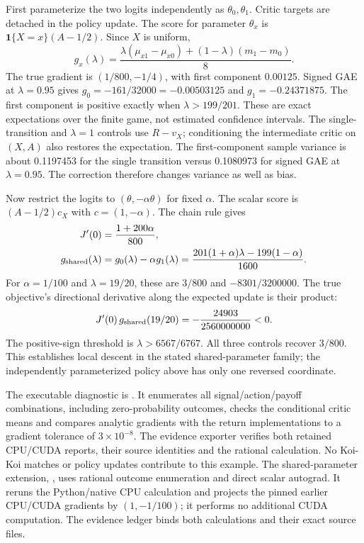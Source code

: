 \documentclass[11pt]{article}
\begin{document}
First parameterize the two logits independently as $\theta_0,\theta_1$.
Critic targets are detached in the policy update. The score for parameter $\theta_x$ is
$\mathbf1\{X=x\}(A-1/2)$. Since $X$ is uniform,
\begin{equation}
 g_x(\lambda)=\frac{\lambda(\mu_{x1}-\mu_{x0})
 +(1-\lambda)(m_1-m_0)}{8}.
\end{equation}
The true gradient is $(1/800,-1/4)$, with first component $0.00125$.
Signed GAE at $\lambda=0.95$ gives $g_0=-161/32000=-0.00503125$ and
$g_1=-0.24371875$. The first component is positive exactly
when $\lambda>199/201$. These are exact expectations over the finite game,
not estimated confidence intervals. The single-transition and $\lambda=1$
controls use $R-v_X$; conditioning the intermediate critic on $(X,A)$ also
restores the expectation. The first-component sample variance is about
0.1197453 for the single transition versus 0.1080973 for signed GAE at $\lambda=0.95$.
The correction therefore changes variance as well as bias.

Now restrict the logits to $(\theta,-\alpha\theta)$ for fixed $\alpha$.
The scalar score is $(A-1/2)c_X$ with $c=(1,-\alpha)$. The chain rule gives
\begin{align}
 J'(0)&=\frac{1+200\alpha}{800},\\
 g_{\rm shared}(\lambda)&=g_0(\lambda)-\alpha g_1(\lambda)
 =\frac{201(1+\alpha)\lambda-199(1-\alpha)}{1600}.
\end{align}
For $\alpha=1/100$ and $\lambda=19/20$, these are $3/800$ and
$-8301/3200000$. The true objective's directional derivative along the expected
update is their product:
\begin{equation}
 J'(0)\,g_{\rm shared}(19/20)=-\frac{24903}{2560000000}<0.
\end{equation}
The positive-sign threshold
is $\lambda>6567/6767$. All three controls recover $3/800$. This establishes
local descent in the stated shared-parameter family; the independently
parameterized policy above has only one reversed coordinate.

The executable diagnostic is .
It enumerates all signal/action/payoff combinations, including zero-probability
outcomes, checks the conditional critic means and compares analytic gradients
with the return implementations to a gradient tolerance of $3\times10^{-8}$.
The evidence exporter verifies both retained
CPU/CUDA reports, their source identities and the rational calculation. No
Koi-Koi matches or policy updates contribute to this example.
The shared-parameter extension, ,
uses rational outcome enumeration and direct scalar autograd. It reruns the
Python/native CPU calculation and projects the pinned earlier CPU/CUDA gradients
by $(1,-1/100)$; it performs no additional CUDA computation. The evidence ledger
binds both calculations and their exact source files.
\end{document}
